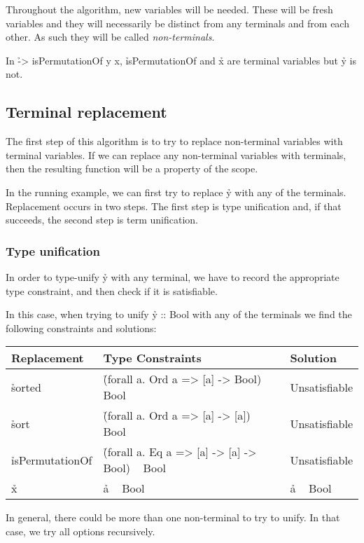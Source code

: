\documentclass[a4paper, 11pt]{article}
\begin{document}
Throughout the algorithm, new variables will be needed.
These will be fresh variables and they will necessarily be distinct from any terminals and from each other.
As such they will be called \emph{non-terminals}.

\begin{ex}
  In \h{\x -> isPermutationOf y x}, \h{isPermutationOf} and \h{x} are terminal variables but \h{y} is not.
\end{ex}


\subsection{Terminal replacement}

The first step of this algorithm is to try to replace non-terminal variables with terminal variables.
If we can replace any non-terminal variables with terminals, then the resulting function will be a property of the scope.

In the running example, we can first try to replace \h{y} with any of the terminals.
Replacement occurs in two steps.
The first step is type unification and, if that succeeds, the second step is term unification.

\subsubsection{Type unification}

In order to type-unify \h{y} with any terminal, we have to record the appropriate type constraint, and then check if it is satisfiable.

In this case, when trying to unify \h{y :: Bool} with any of the terminals we find the following constraints and solutions:

\begin{tabular}{|l|l|l|}
  \hline
  Replacement & Type Constraints & Solution \\
  \hline
  \hline
  \h{sorted} & \h{(forall a. Ord a => [a] -> Bool) ~ Bool} & Unsatisfiable \\
  \hline
  \h{sort} & \h{(forall a. Ord a => [a] -> [a]) ~ Bool} & Unsatisfiable \\
  \hline
  \h{isPermutationOf} & \h{(forall a. Eq a => [a] -> [a] -> Bool) ~ Bool} & Unsatisfiable \\
  \hline
  \h{x} & \h{a ~ Bool} & \h{a ~ Bool} \\
  \hline
\end{tabular}

In general, there could be more than one non-terminal to try to unify.
In that case, we try all options recursively. 
\end{document}
